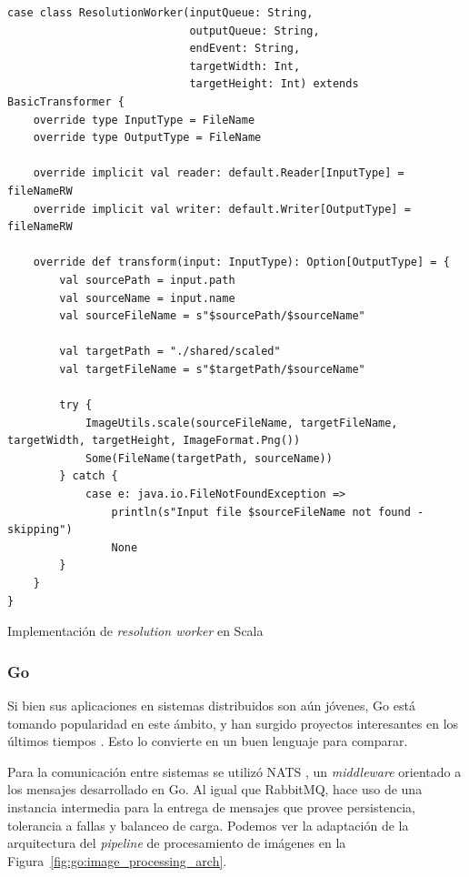 \documentclass[11pt]{article}
\let\Oldsubsubsection\subsubsection
\renewcommand{\subsubsection}{\FloatBarrier\Oldsubsubsection}
\newcommand{\english}[1]{\textit{#1}}
\begin{document}
\begin{listing}[h]
\begin{verbatim}
case class ResolutionWorker(inputQueue: String,
                            outputQueue: String,
                            endEvent: String,
                            targetWidth: Int,
                            targetHeight: Int) extends BasicTransformer {
    override type InputType = FileName
    override type OutputType = FileName

    override implicit val reader: default.Reader[InputType] = fileNameRW
    override implicit val writer: default.Writer[OutputType] = fileNameRW

    override def transform(input: InputType): Option[OutputType] = {
        val sourcePath = input.path
        val sourceName = input.name
        val sourceFileName = s"$sourcePath/$sourceName"

        val targetPath = "./shared/scaled"
        val targetFileName = s"$targetPath/$sourceName"

        try {
            ImageUtils.scale(sourceFileName, targetFileName, targetWidth, targetHeight, ImageFormat.Png())
            Some(FileName(targetPath, sourceName))
        } catch {
            case e: java.io.FileNotFoundException =>
                println(s"Input file $sourceFileName not found - skipping")
                None
        }
    }
}
\end{verbatim}
\caption{Implementación de \english{resolution worker} en Scala}
\label{code:scala:resolution_worker}
\end{listing}

\subsubsection{Go}

Si bien sus aplicaciones en sistemas distribuidos son aún jóvenes, Go está tomando popularidad en este ámbito, y han surgido proyectos interesantes en los últimos tiempos \cite{go:ex:awesome-go}. Esto lo convierte en un buen lenguaje para comparar.

Para la comunicación entre sistemas se utilizó NATS \cite{go:lib:nats}, un \english{middleware} orientado a los mensajes desarrollado en Go. Al igual que RabbitMQ, hace uso de una instancia intermedia para la entrega de mensajes que provee persistencia, tolerancia a fallas y balanceo de carga. Podemos ver la adaptación de la arquitectura del \english{pipeline} de procesamiento de imágenes en la Figura~\ref{fig:go:image_processing_arch}.
\end{document}
